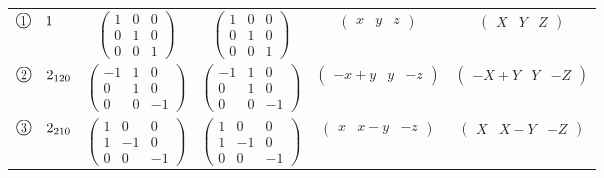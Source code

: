 \documentclass[fleqn,10pt,landscape]{jsarticle}
\begin{document}
\begin{center}
\begin{longtable}{lcccc}
$ {\ooalign{\hfil\resizebox{.8\width}{\height}{1}\hfil\crcr\raise.1ex\hbox{\large$\bigcirc$}}}\quad 1 $ & $ \begin{pmatrix} 1 & 0 & 0 \\ 0 & 1 & 0 \\ 0 & 0 & 1 \end{pmatrix} $ & $ \begin{pmatrix} 1 & 0 & 0 \\ 0 & 1 & 0 \\ 0 & 0 & 1 \end{pmatrix} $ & $ \begin{pmatrix} x & y & z \end{pmatrix} $ & $ \begin{pmatrix} X & Y & Z \end{pmatrix} $ \\
$ {\ooalign{\hfil\resizebox{.8\width}{\height}{2}\hfil\crcr\raise.1ex\hbox{\large$\bigcirc$}}}\quad 2{}_{120} $ & $ \begin{pmatrix} -1 & 1 & 0 \\ 0 & 1 & 0 \\ 0 & 0 & -1 \end{pmatrix} $ & $ \begin{pmatrix} -1 & 1 & 0 \\ 0 & 1 & 0 \\ 0 & 0 & -1 \end{pmatrix} $ & $ \begin{pmatrix} - x + y & y & - z \end{pmatrix} $ & $ \begin{pmatrix} - X + Y & Y & - Z \end{pmatrix} $ \\
$ {\ooalign{\hfil\resizebox{.8\width}{\height}{3}\hfil\crcr\raise.1ex\hbox{\large$\bigcirc$}}}\quad 2{}_{210} $ & $ \begin{pmatrix} 1 & 0 & 0 \\ 1 & -1 & 0 \\ 0 & 0 & -1 \end{pmatrix} $ & $ \begin{pmatrix} 1 & 0 & 0 \\ 1 & -1 & 0 \\ 0 & 0 & -1 \end{pmatrix} $ & $ \begin{pmatrix} x & x - y & - z \end{pmatrix} $ & $ \begin{pmatrix} X & X - Y & - Z \end{pmatrix} $ \\

\end{longtable}
\end{center}
\end{document}
